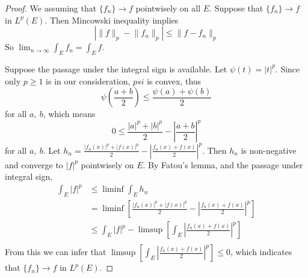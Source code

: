 \documentclass[lang=en, 12pt]{elegantbook}
\begin{document}
        \begin{proof}
            We assuming that $\{f_n\} \to f$ pointwisely on all $E$. Suppose that 
        $\{f_n\} \to f$ in $L^p(E)$. Then Mincowski inequality implies 
        $$|\lVert f \rVert_p -\lVert f_n \rVert_p| \leq \lVert f - f_n \rVert_p$$
        So $\lim_{n \to \infty} \int_E f_n = \int_E f$.\par 
            Suppose the passage under the integral sign is available. Let $\psi(t) = |t|^p$. Since only $p \geq 1$
        is in our consideration, $psi$ is convex, thus 
        $$\psi(\frac{a+b}{2}) \leq \frac{\psi(a)+\psi(b)}{2}$$
        for all $a,\ b$, which means 
        $$0 \leq \frac{|a|^p + |b|^p}{2} - |\frac{a+b}{2}|^p$$
        for all $a , \ b$.
            Let $h_n = \frac{|f_n(x)|^p + |f(x)|^p}{2} - |\frac{f_n(x)+f(x)}{2}|^p$. Then $h_n$ is 
        non-negative and converge to $|f|^p$ pointwisely on $E$. By Fatou's lemma, and the passage under 
        integral sign, 
        \begin{equation*}
            \begin{aligned}
                \int_E |f|^p &\leq \liminf \int_E h_n\\
                &= \liminf [\frac{|f_n(x)|^p + |f(x)|^p}{2} - |\frac{f_n(x)+f(x)}{2}|^p] \\
                &\leq \int_E |f|^p - \limsup[\int_E |\frac{f_n(x)+f(x)}{2}|^p]\\
            \end{aligned}
        \end{equation*}
            From this we can infer that $\limsup[\int_E |\frac{f_n(x)+f(x)}{2}|^p] \leq 0$, which indicates
        that $\{f_n\} \to f$ in $L^p(E)$.  
        \end{proof}
\end{document}
